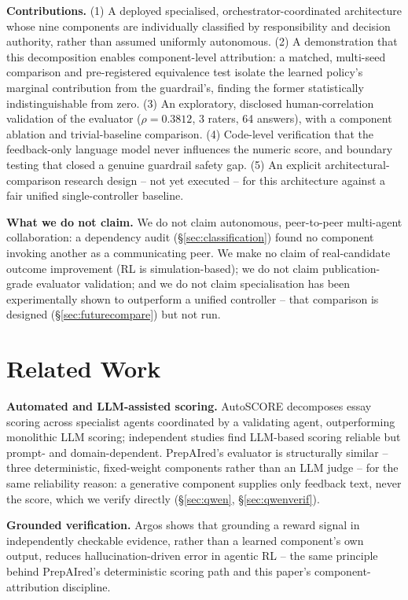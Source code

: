 \documentclass[conference]{IEEEtran}
\begin{document}
\textbf{Contributions.} (1) A deployed specialised, orchestrator-coordinated architecture whose nine components are individually classified by responsibility and decision authority, rather than assumed uniformly autonomous. (2) A demonstration that this decomposition enables component-level attribution: a matched, multi-seed comparison and pre-registered equivalence test isolate the learned policy's marginal contribution from the guardrail's, finding the former statistically indistinguishable from zero. (3) An exploratory, disclosed human-correlation validation of the evaluator ($\rho = 0.3812$, 3 raters, 64 answers), with a component ablation and trivial-baseline comparison. (4) Code-level verification that the feedback-only language model never influences the numeric score, and boundary testing that closed a genuine guardrail safety gap. (5) An explicit architectural-comparison research design -- not yet executed -- for this architecture against a fair unified single-controller baseline.

\textbf{What we do not claim.} We do not claim autonomous, peer-to-peer multi-agent collaboration: a dependency audit (\S\ref{sec:classification}) found no component invoking another as a communicating peer. We make no claim of real-candidate outcome improvement (RL is simulation-based); we do not claim publication-grade evaluator validation; and we do not claim specialisation has been experimentally shown to outperform a unified controller -- that comparison is designed (\S\ref{sec:futurecompare}) but not run.

\section{Related Work}

\textbf{Automated and LLM-assisted scoring.} AutoSCORE \cite{wang2025} decomposes essay scoring across specialist agents coordinated by a validating agent, outperforming monolithic LLM scoring; independent studies \cite{karjus2026,mendonca2025} find LLM-based scoring reliable but prompt- and domain-dependent. PrepAIred's evaluator is structurally similar -- three deterministic, fixed-weight components rather than an LLM judge -- for the same reliability reason: a generative component supplies only feedback text, never the score, which we verify directly (\S\ref{sec:qwen}, \S\ref{sec:qwenverif}).

\textbf{Grounded verification.} Argos \cite{argos2026} shows that grounding a reward signal in independently checkable evidence, rather than a learned component's own output, reduces hallucination-driven error in agentic RL -- the same principle behind PrepAIred's deterministic scoring path and this paper's component-attribution discipline.
\end{document}

